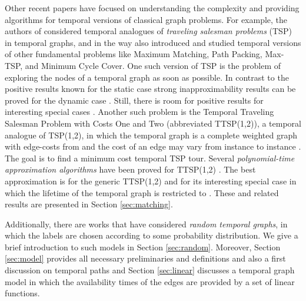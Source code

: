 \documentclass[oribibl, 11pt]{llncs}
\begin{document}
Other recent papers have focused on understanding the complexity and providing algorithms for temporal versions of classical graph problems. For example, the authors of \cite{MS14} considered temporal analogues of \emph{traveling salesman problems} (TSP) in temporal graphs, and in the way also introduced and studied temporal versions of other fundamental problems like {\sc Maximum Matching}, {\sc Path Packing}, {\sc Max-TSP}, and {\sc Minimum Cycle Cover}. One such version of TSP is the problem of exploring the nodes of a temporal graph as soon as possible. In contrast to the positive results known for the static case strong inapproximability results can be proved for the dynamic case \cite{MS14,EHK15}. Still, there is room for positive results for interesting special cases \cite{EHK15}. Another such problem is the {\sc Temporal Traveling Salesman Problem with Costs One and Two} (abbreviated TTSP(1,2)), a temporal analogue of TSP(1,2), in which the temporal graph is a complete weighted graph with edge-costs from  and the cost of an edge may vary from instance to instance \cite{MS14}. The goal is to find a minimum cost temporal TSP tour. Several \emph{polynomial-time approximation algorithms} have been proved for TTSP(1,2) \cite{MS14}. The best approximation is  for the generic TTSP(1,2) and  for its interesting special case in which the lifetime of the temporal graph is restricted to . These and related results are presented in Section \ref{sec:matching}.

Additionally, there are works that have considered \emph{random temporal graphs}, in which the labels are chosen according to some probability distribution. We give a brief introduction to such models in Section \ref{sec:random}. Moreover, Section \ref{sec:model} provides all necessary preliminaries and definitions and also a first discussion on temporal paths and Section \ref{sec:linear} discusses a temporal graph model in which the availability times of the edges are provided by a set of linear functions.
\end{document}
